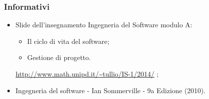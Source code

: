 \subsubsection{Informativi}
\begin{itemize}
\item Slide dell'insegnamento Ingegneria del Software modulo A:\\
\begin{itemize}
\item Il ciclo di vita del software;
\item Gestione di progetto.
\end{itemize}
\url{http://www.math.unipd.it/~tullio/IS-1/2014/} ;

\item Ingegneria del software - Ian Sommerville - 9a Edizione (2010).
\end{itemize}

